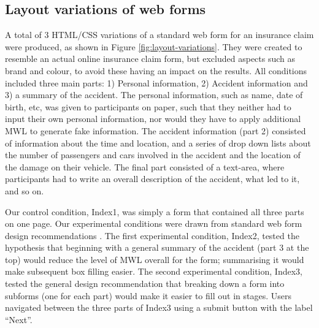 \documentclass[../main/Feedback.tex]{subfiles}
\begin{document}
\subsection{Layout variations of web forms}
A total of 3 HTML/CSS variations of a standard web form for an insurance claim were produced, as shown in Figure \ref{fig:layout-variations}.
They were created to resemble an actual online insurance claim form, but excluded aspects such as brand and colour, to avoid these having an impact on the results.
All conditions included three main parts: 1) Personal information, 2) Accident information and 3) a summary of the accident.
The personal information, such as name, date of birth, etc, was given to participants on paper, such that they neither had to input their own personal information, nor would they have to apply additional MWL to generate fake information.
The accident information (part 2) consisted of information about the time and location, and a series of drop down lists about the number of passengers and cars involved in the accident and the location of the damage on their vehicle.
The final part consisted of a text-area, where participants had to write an overall description of the accident, what led to it, and so on.

Our control condition, Index1, was simply a form that contained all three parts on one page.
Our experimental conditions were drawn from standard web form design recommendations \cite{wroblewski2008web}.
The first experimental condition, Index2, tested the hypothesis that beginning with a general summary of the accident (part 3 at the top) would reduce the level of MWL overall for the form; summarising it would make subsequent box filling easier.
The second experimental condition, Index3, tested the general design recommendation that breaking down a form into subforms (one for each part) would make it easier to fill out in stages.
Users navigated between the three parts of Index3 using a submit button with the label ``Next''.


\end{document}
